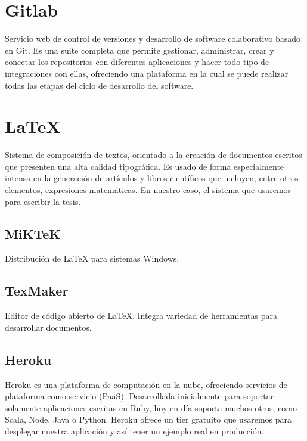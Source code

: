 \section{Gitlab}
Servicio web de control de versiones y desarrollo de software colaborativo basado en Git. Es una suite completa que permite gestionar, administrar, crear y conectar los repositorios con diferentes aplicaciones y hacer todo tipo de integraciones con ellas, ofreciendo una plataforma en la cual se puede realizar todas las etapas del ciclo de desarrollo del software.

\section{LaTeX}
Sistema de composición de textos, orientado a la creación de documentos escritos que presenten una alta calidad tipográfica. Es usado de forma especialmente intensa en la generación de artículos y libros científicos que incluyen, entre otros elementos, expresiones matemáticas. En nuestro caso, el sistema que usaremos para escribir la tesis.

\subsection{MiKTeK}
Distribución de LaTeX para sistemas Windows.

\subsection{TexMaker}
Editor de código abierto de LaTeX. Integra variedad de herramientas para desarrollar documentos.

\subsection{Heroku}
Heroku es una plataforma de computación en la nube, ofreciendo servicios de plataforma como servicio (PaaS). Desarrollada inicialmente para soportar solamente aplicaciones escritas en Ruby, hoy en día soporta muchos otros, como Scala, Node, Java o Python. Heroku ofrece un tier gratuito que usaremos para desplegar nuestra aplicación y así tener un ejemplo real en producción.
